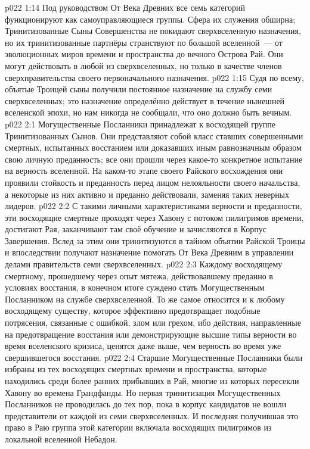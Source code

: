 \vs p022 1:14 Под руководством От Века Древних все семь категорий функционируют как самоуправляющиеся группы. Сфера их служения обширна; Тринитизованные Сыны Совершенства не покидают сверхвселенную назначения, но их тринитизованные партнёры странствуют по большой вселенной~--- от эволюционных миров времени и пространства до вечного Острова Рай. Они могут действовать в любой из сверхвселенных, но только в качестве членов сверхправительства своего первоначального назначения.
\vs p022 1:15 Судя по всему, объятые Троицей сыны получили постоянное назначение на службу семи сверхвселенных; это назначение определённо действует в течение нынешней вселенской эпохи, но нам никогда не сообщали, что оно должно быть вечным.
\vs p022 2:1 Могущественные Посланники принадлежат к восходящей группе Тринитизованных Сынов. Они представляют собой класс ставших совершенными смертных, испытанных восстанием или доказавших иным равнозначным образом свою личную преданность; все они прошли через какое\hyp{}то конкретное испытание на верность вселенной. На каком\hyp{}то этапе своего Райского восхождения они проявили стойкость и преданность перед лицом нелояльности своего начальства, а некоторые из них активно и преданно действовали, заменяя таких неверных лидеров.
\vs p022 2:2 С такими личными характеристиками верности и преданности, эти восходящие смертные проходят через Хавону с потоком пилигримов времени, достигают Рая, заканчивают там своё обучение и зачисляются в Корпус Завершения. Вслед за этим они тринитизуются в тайном объятии Райской Троицы и впоследствии получают назначение помогать От Века Древним в управлении делами правительств семи сверхвселенных.
\vs p022 2:3 Каждому восходящему смертному, прошедшему через опыт мятежа, действовавшему преданно в условиях восстания, в конечном итоге суждено стать Могущественным Посланником на службе сверхвселенной. То же самое относится и к любому восходящему существу, которое эффективно предотвращает подобные потрясения, связанные с ошибкой, злом или грехом, ибо действия, направленные на предотвращение восстания или демонстрирующие высшие типы верности во время вселенского кризиса, ценятся даже выше, чем верность во время уже свершившегося восстания.
\vs p022 2:4 Старшие Могущественные Посланники были избраны из тех восходящих смертных времени и пространства, которые находились среди более ранних прибывших в Рай, многие из которых пересекли Хавону во времена Грандфанды. Но первая тринитизация Могущественных Посланников не проводилась до тех пор, пока в корпус кандидатов не вошли представители от каждой из семи сверхвселенных. И последняя получившая это право в Раю группа этой категории включала восходящих пилигримов из локальной вселенной Небадон.

